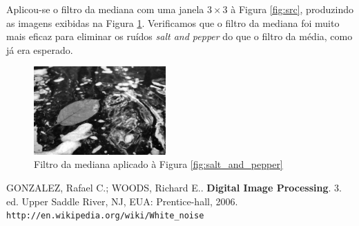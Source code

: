 \documentclass[10pt,a4paper]{article}
\begin{document}
Aplicou-se o filtro da mediana com uma janela $3 \times 3$ à Figura \ref{fig:src}, produzindo as imagens exibidas na Figura \ref{fig:median_filter}. Verificamos que o filtro da mediana foi muito mais eficaz para eliminar os ruídos \textit{salt and pepper} do que o filtro da média, como já era esperado.

\begin{figure}[!ht]
    \centering
    \includegraphics[width=0.45\textwidth]{dst_sp_median.jpg}
    \caption{Filtro da mediana aplicado à Figura \ref{fig:salt_and_pepper}}
    \label{fig:median_filter}
\end{figure}

\begin{thebibliography}{99}
     GONZALEZ, Rafael C.; WOODS, Richard E.. \textbf{Digital Image Processing}. 3. ed. Upper Saddle River, NJ, EUA: Prentice-hall, 2006.
     \texttt{http://en.wikipedia.org/wiki/White\_noise}
\end{thebibliography}
\end{document}
